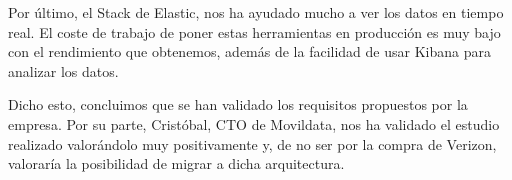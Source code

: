 Por último, el Stack de Elastic, nos ha ayudado mucho a ver los datos en tiempo real. El coste de trabajo de poner estas herramientas en producción es muy bajo con el rendimiento que obtenemos, además de la facilidad de usar Kibana para analizar los datos. \par

Dicho esto, concluimos que se han validado los requisitos propuestos por la empresa. Por su parte, Cristóbal, CTO de Movildata, nos ha validado el estudio realizado valorándolo muy positivamente y, de no ser por la compra de Verizon, valoraría la posibilidad de migrar a dicha arquitectura.